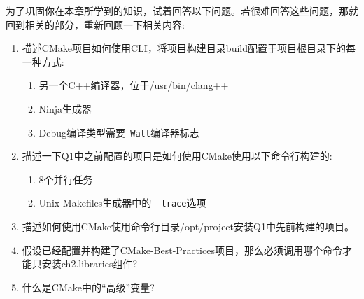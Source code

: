 为了巩固你在本章所学到的知识，试着回答以下问题。若很难回答这些问题，那就回到相关的部分，重新回顾一下相关内容:

\begin{enumerate}
\item 
描述CMake项目如何使用CLI，将项目构建目录build配置于项目根目录下的每一种方式:

\begin{enumerate}[label=\Alph*.]
\item 
另一个C++编译器，位于/usr/bin/clang++

\item 
Ninja生成器

\item 
Debug编译类型需要\texttt{-Wall}编译器标志
\end{enumerate}

\item 
描述一下Q1中之前配置的项目是如何使用CMake使用以下命令行构建的:

\begin{enumerate}[label=\Alph*.]
\item 
8个并行任务

\item 
Unix Makefiles生成器中的\texttt{-{}-trace}选项
\end{enumerate}

\item 
描述如何使用CMake使用命令行目录/opt/project安装Q1中先前构建的项目。

\item 
假设已经配置并构建了CMake-Best-Practices项目，那么必须调用哪个命令才能只安装ch2.libraries组件?

\item 
什么是CMake中的“高级”变量?
\end{enumerate}